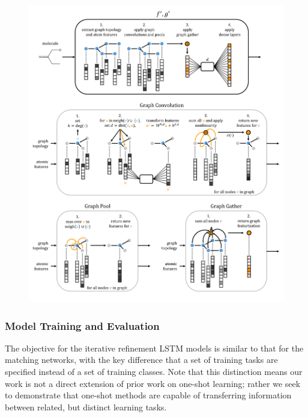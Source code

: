 \begin{figure}[H]
\includegraphics[width=\textwidth]{Images/graphconv_graphic_v2.png}
\label{conv}
\end{figure}


\subsubsection{Model Training and Evaluation}
The objective for the iterative refinement LSTM models is similar to that for the matching networks, with the key difference that a set of training tasks are specified instead of a set of training classes. Note that this distinction means our work is not a direct extension of prior work on one-shot learning; rather we seek to demonstrate that one-shot methods are capable of transferring information between related, but distinct learning tasks. 

